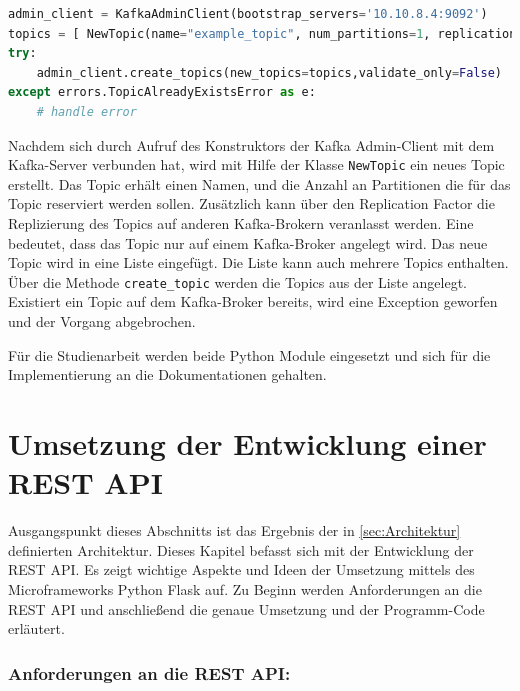 \documentclass[a4paper,titlepage,halfparskip,12pt]{scrreprt}
\begin{document}
\begin{onehalfspacing}
\begin{lstlisting}[language=python, caption={Beispiel: Anlegen eines Topics mit dem KafkaAdminClient des Moduls kafka-python}, label={lst:kafkapythonAdmin}]
admin_client = KafkaAdminClient(bootstrap_servers='10.10.8.4:9092')
topics = [ NewTopic(name="example_topic", num_partitions=1, replication_factor=1) ]
try:
    admin_client.create_topics(new_topics=topics,validate_only=False)
except errors.TopicAlreadyExistsError as e:
    # handle error

\end{lstlisting}

Nachdem sich durch Aufruf des Konstruktors der Kafka Admin-Client mit dem Kafka-Server verbunden hat, wird mit Hilfe der Klasse \texttt{NewTopic} ein neues Topic erstellt. Das Topic erhält einen Namen, und die Anzahl an Partitionen die für das Topic reserviert werden sollen. Zusätzlich kann über den Replication Factor die Replizierung des Topics auf anderen Kafka-Brokern veranlasst werden. Eine \grqq bedeutet, dass das Topic nur auf einem Kafka-Broker angelegt wird. Das neue Topic wird in eine Liste eingefügt. Die Liste kann auch mehrere Topics enthalten. Über die Methode \texttt{create\_topic} werden die Topics aus der Liste angelegt. Existiert ein Topic auf dem Kafka-Broker bereits, wird eine Exception geworfen und der Vorgang abgebrochen.

Für die Studienarbeit werden beide Python Module eingesetzt und sich für die Implementierung an die Dokumentationen \cite{pykafkaDocumentation, pythonKafka} gehalten.

\pagebreak

\section{Umsetzung der Entwicklung einer \acs{REST} \acs{API}}
\label{subsec:Backend}

Ausgangspunkt dieses Abschnitts ist das Ergebnis der in \autoref{sec:Architektur} definierten Architektur. Dieses Kapitel befasst sich mit der Entwicklung der \acs{REST} \acs{API}. Es zeigt wichtige Aspekte und Ideen der Umsetzung mittels des Microframeworks Python Flask auf. Zu Beginn werden Anforderungen an die \acs{REST} \acs{API} und anschließend die genaue Umsetzung und der Programm-Code erläutert.

\subsubsection*{Anforderungen an die \acs{REST} \acs{API}:}


\end{onehalfspacing}
\end{document}
